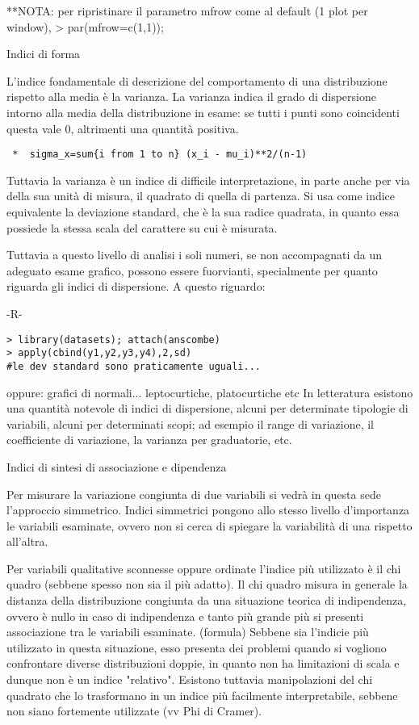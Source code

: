 \documentclass{book}
\begin{document}
**NOTA: per ripristinare il parametro mfrow come al default (1 plot per window), > par(mfrow=c(1,1));

Indici di forma

L'indice fondamentale di descrizione del comportamento di una distribuzione rispetto alla media \`{e} la varianza.
La varianza indica il grado di dispersione intorno alla media della distribuzione in esame: se tutti i punti sono coincidenti questa vale 0, altrimenti una quantit\`{a} positiva.

\begin{verbatim}
 *	sigma_x=sum{i from 1 to n} (x_i - mu_i)**2/(n-1)
\end{verbatim}

Tuttavia la varianza \`{e} un indice di difficile interpretazione, in parte anche per via della sua unit\`{a} di misura, il quadrato di quella di partenza. Si usa come indice equivalente la deviazione standard, che \`{e} la sua radice quadrata, in quanto essa possiede la stessa scala del carattere su cui \`{e} misurata.

Tuttavia a questo livello di analisi i soli numeri, se non accompagnati da un adeguato esame grafico, possono essere fuorvianti, specialmente per quanto riguarda gli indici di dispersione. A questo riguardo:

	-R-
\begin{verbatim}
> library(datasets); attach(anscombe)
> apply(cbind(y1,y2,y3,y4),2,sd)
#le dev standard sono praticamente uguali...
\end{verbatim}

oppure:
grafici di normali... leptocurtiche, platocurtiche etc
In letteratura esistono una quantit\`{a} notevole di indici di dispersione, alcuni per determinate tipologie di variabili, alcuni per determinati scopi; ad esempio il range di variazione, il coefficiente di variazione, la varianza per graduatorie, etc.

Indici di sintesi di associazione e dipendenza

Per misurare la variazione congiunta di due variabili si vedr\`{a} in questa sede l'approccio simmetrico.
Indici simmetrici pongono allo stesso livello d'importanza le variabili esaminate, ovvero non si cerca di spiegare la variabilit\`{a} di una rispetto all'altra.

Per variabili qualitative sconnesse oppure ordinate l'indice più utilizzato \`{e} il chi quadro (sebbene spesso non sia il più adatto). Il chi quadro misura in generale la distanza della distribuzione congiunta da una situazione teorica di indipendenza, ovvero \`{e} nullo in caso di indipendenza e tanto più grande più si presenti associazione tra le variabili esaminate.
(formula)
Sebbene sia l'indicie più utilizzato in questa situazione, esso presenta dei problemi quando si vogliono confrontare diverse distribuzioni doppie, in quanto non ha limitazioni di scala e dunque non \`{e} un indice "relativo". Esistono tuttavia manipolazioni del chi quadrato che lo trasformano in un indice più facilmente interpretabile, sebbene non siano fortemente utilizzate (vv Phi di Cramer).
\end{document}
